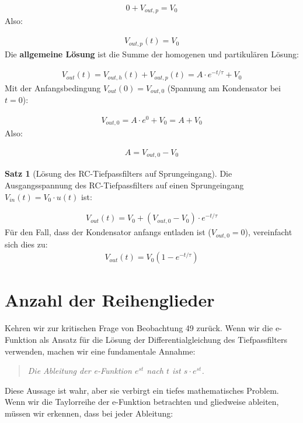 \documentclass[a4paper,12pt,twoside]{report}
\theoremstyle{definition}
\newtheorem{satz}{Satz}
\begin{document}
\begin{align}
	0 + V_{out,p} = V_0
\end{align}
Also:

\begin{align}
	V_{out,p}(t) = V_0
\end{align}
Die \textbf{allgemeine Lösung} ist die Summe der homogenen und partikulären Lösung:

\begin{align}
	V_{out}(t) = V_{out,h}(t) + V_{out,p}(t) = A \cdot e^{-t/\tau} + V_0
\end{align}
Mit der Anfangsbedingung $V_{out}(0) = V_{out,0}$ (Spannung am Kondensator bei $t=0$):

\begin{align}
	V_{out,0} = A \cdot e^0 + V_0 = A + V_0
\end{align}
Also:

\begin{align}
	A = V_{out,0} - V_0
\end{align}

\begin{satz}[Lösung des RC-Tiefpassfilters auf Sprungeingang]
	Die Ausgangsspannung des RC-Tiefpassfilters auf einen Sprungeingang $V_{in}(t) = V_0 \cdot u(t)$ ist:
	
	\begin{align}
		V_{out}(t) = V_0 + (V_{out,0} - V_0) \cdot e^{-t/\tau}
	\end{align}
	Für den Fall, dass der Kondensator anfangs entladen ist ($V_{out,0} = 0$), vereinfacht sich dies zu:
	\begin{align}
		V_{out}(t) = V_0 (1 - e^{-t/\tau})
	\end{align}
\end{satz}

\section{Anzahl der Reihenglieder}

Kehren wir zur kritischen Frage von Beobachtung 49 zurück. Wenn wir die e-Funktion als Ansatz für die Lösung der Differentialgleichung des Tiefpassfilters verwenden, machen wir eine fundamentale Annahme:

\begin{quote}
	\textit{Die Ableitung der e-Funktion $e^{st}$ nach $t$ ist $s \cdot e^{st}$.}
\end{quote}

Diese Aussage ist wahr, aber sie verbirgt ein tiefes mathematisches Problem. Wenn wir die Taylorreihe der e-Funktion betrachten und gliedweise ableiten, müssen wir erkennen, dass bei jeder Ableitung:
\end{document}
